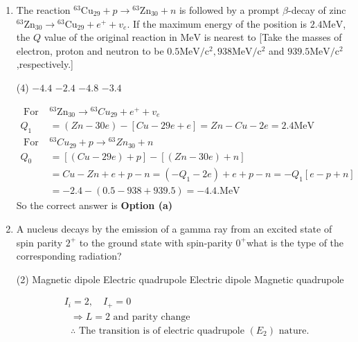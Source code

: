 \begin{enumerate}
\begin{answer}
	\end{answer}
	\item The reaction ${ }^{63} \mathrm{Cu}_{29}+p \rightarrow{ }^{63} \mathrm{Zn}_{30}+n$ is followed by a prompt $\beta$-decay of zinc ${ }^{63} \mathrm{Zn}_{30} \rightarrow{ }^{63} \mathrm{Cu}_{29}+e^{+}+v_e$. If the maximum energy of the position is $2.4 \mathrm{MeV}$, the $Q$ value of the original reaction in $\mathrm{MeV}$ is nearest to
	[Take the masses of electron, proton and neutron to be $0.5 \mathrm{MeV} / \mathrm{c}^2, 938 \mathrm{MeV} / \mathrm{c}^2$ and $939.5 \mathrm{MeV} / \mathrm{c}^2$,respectively.]
	{}
	\begin{tasks}(4)
		\task[\textbf{a.}]$-4.4$
		\task[\textbf{b.}]$-2.4$
		\task[\textbf{c.}]$-4.8$
		\task[\textbf{d.}]$-3.4$
	\end{tasks}
	\begin{answer}
		\begin{align*}
		\text{ For }&{ }^{63} \mathrm{Zn}_{30} \rightarrow{ }^{63} C u_{29}+e^{+}+v_e\\
		Q_1&=(Z n-30 e)-[C u-29 e+e]=Z n-C u-2 e=2.4 \mathrm{MeV} \\
		\text { For }&{ }^{63} C u_{29}+p \rightarrow{ }^{63} Z n_{30}+n \\
		Q_0&=[(C u-29 e)+p]-[(Z n-30 e)+n] \\
		&=C u-Z n+e+p-n=\left(-Q_1-2 e\right)+e+p-n=-Q_1[e-p+n] \\
		&=-2.4-(0.5-938+939.5)=-4.4 . \mathrm{MeV}
		\end{align*}
		So the correct answer is \textbf{Option (a)}
	\end{answer}
	\item A nucleus decays by the emission of a gamma ray from an excited state of spin parity $2^{+}$ to the ground state with spin-parity $0^{+}$what is the type of the corresponding radiation?
	{}
	\begin{tasks}(2)
		\task[\textbf{a.}]Magnetic dipole
		\task[\textbf{b.}]Electric quadrupole
		\task[\textbf{c.}]Electric dipole
		\task[\textbf{d.}]Magnetic quadrupole 
	\end{tasks}
	\begin{answer}
		\begin{align*}
		& \text{$I_i=2, \quad I_{+}=0$}\\
		&\text{	$\Rightarrow L=2$ and parity change}\\
		&\text{	$\therefore$ The transition is of electric quadrupole $\left(E_2\right)$ nature.}
		\end{align*}

\end{answer}
\end{enumerate}
